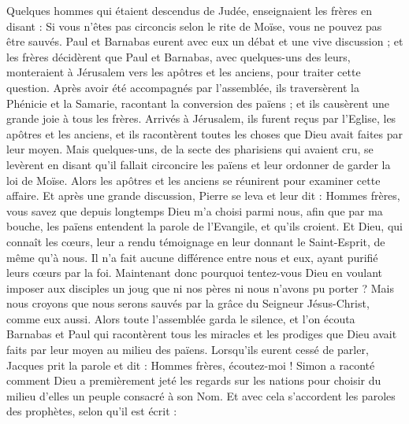 \begin{multicols}{2}
\VerseOne{}Quelques hommes qui étaient descendus de Judée, enseignaient les frères en disant : Si vous n'êtes pas circoncis selon le rite de Moïse, vous ne pouvez pas être sauvés.
Paul et Barnabas eurent avec eux un débat et une vive discussion ; et les frères décidèrent que Paul et Barnabas, avec quelques-uns des leurs, monteraient à Jérusalem vers les apôtres et les anciens, pour traiter cette question.
Après avoir été accompagnés par l’assemblée, ils traversèrent la Phénicie et la Samarie, racontant la conversion des païens ; et ils causèrent une grande joie à tous les frères.
Arrivés à Jérusalem, ils furent reçus par l'Eglise, les apôtres et les anciens, et ils racontèrent toutes les choses que Dieu avait faites par leur moyen.
Mais quelques-uns, de la secte des pharisiens qui avaient cru, se levèrent en disant qu'il fallait circoncire les païens et leur ordonner de garder la loi de Moïse.
Alors les apôtres et les anciens se réunirent pour examiner cette affaire.
Et après une grande discussion, Pierre se leva et leur dit : Hommes frères, vous savez que depuis longtemps Dieu m’a choisi parmi nous, afin que par ma bouche, les païens entendent la parole de l'Evangile, et qu'ils croient.
Et Dieu, qui connaît les cœurs, leur a rendu témoignage en leur donnant le Saint-Esprit, de même qu'à nous.
Il n'a fait aucune différence entre nous et eux, ayant purifié leurs cœurs par la foi.
Maintenant donc pourquoi tentez-vous Dieu en voulant imposer aux disciples un joug que ni nos pères ni nous n'avons pu porter ?
Mais nous croyons que nous serons sauvés par la grâce du Seigneur Jésus-Christ, comme eux aussi.
Alors toute l'assemblée garda le silence, et l’on écouta Barnabas et Paul qui racontèrent tous les miracles et les prodiges que Dieu avait faits par leur moyen au milieu des païens.
Lorsqu’ils eurent cessé de parler, Jacques prit la parole et dit : Hommes frères, écoutez-moi !
Simon a raconté comment Dieu a premièrement jeté les regards sur les nations pour choisir du milieu d’elles un peuple consacré à son Nom. 
Et avec cela s'accordent les paroles des prophètes, selon qu'il est écrit :

\end{multicols}

